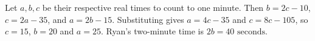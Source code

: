 Let $a,b,c$ be their respective real times to count to one minute. Then $b=2c-10$, $c=2a-35$, and $a=2b-15$. Substituting gives $a=4c-35$ and $c=8c-105$, so $c=15$, $b=20$ and $a=25$. Ryan's two-minute time is $2b=\boxed{40\text{ seconds}}$.
